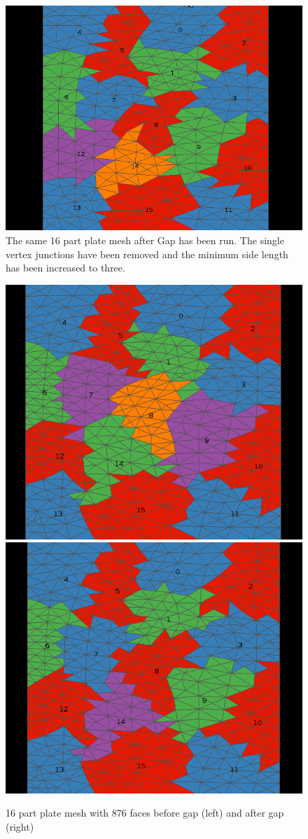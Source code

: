 \documentclass{thesis}
\begin{document}
\begin{figure} [!ht]
\centering
\captionsetup{justification=centering,margin=1cm}
\includegraphics[width=.6\textwidth]{results_after.png}
\caption{\label{fig:plate_gap} \textnormal{The same 16 part plate mesh after Gap has been run. The single vertex junctions have been removed and the minimum side length has been increased to three.}}
\end{figure}


\begin{figure} [!hp]
\centering
\captionsetup{justification=centering,margin=1cm}
\includegraphics[width=.4\textwidth]{before_876.png}
\includegraphics[width=.4\textwidth]{after_876.png}
\caption{\label{fig:gap1} \textnormal{16 part plate mesh with 876 faces before gap (left) and after gap (right)}}
\end{figure}
\end{document}
